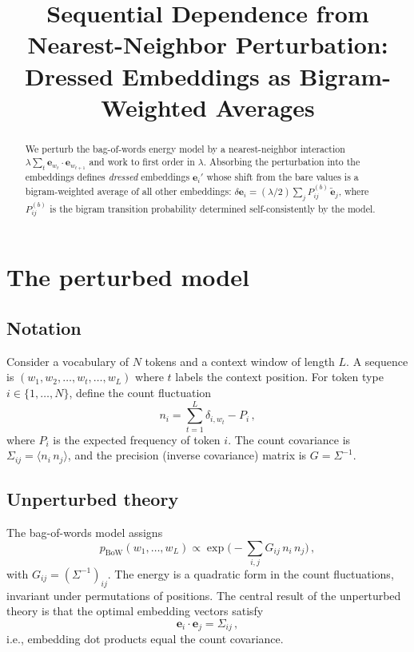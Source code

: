 \documentclass[11pt]{article}
\title{Sequential Dependence from Nearest-Neighbor Perturbation:\\Dressed Embeddings as Bigram-Weighted Averages}
\author{}
\date{}
\newcommand{\ee}{\bm{e}}
\newcommand{\BoW}{\mathrm{BoW}}
\begin{document}
\maketitle

\begin{abstract}
We perturb the bag-of-words energy model by a nearest-neighbor interaction $\lambda \sum_t \ee_{w_t} \cdot \ee_{w_{t+1}}$ and work to first order in $\lambda$. Absorbing the perturbation into the embeddings defines \emph{dressed} embeddings $\ee_i'$ whose shift from the bare values is a bigram-weighted average of all other embeddings: $\delta \ee_i = (\lambda/2)\sum_j P_{ij}^{(b)}\, \tilde{\ee}_j$, where $P_{ij}^{(b)}$ is the bigram transition probability determined self-consistently by the model.
\end{abstract}

\tableofcontents

\section{The perturbed model}\label{sec:setup}

\subsection{Notation}

Consider a vocabulary of $N$ tokens and a context window of length $L$. A sequence is $(w_1, w_2, \ldots, w_t, \ldots, w_L)$ where $t$ labels the context position. For token type $i \in \{1, \ldots, N\}$, define the count fluctuation
\begin{equation}\label{eq:count}
    n_i = \sum_{t=1}^{L} \delta_{i, w_t} - P_i\,,
\end{equation}
where $P_i$ is the expected frequency of token $i$. The count covariance is $\Sigma_{ij} = \langle n_i\, n_j \rangle$, and the precision (inverse covariance) matrix is $G = \Sigma^{-1}$.

\subsection{Unperturbed theory}

The bag-of-words model assigns
\begin{equation}\label{eq:bow}
    p_{\BoW}(w_1, \ldots, w_L) \propto \exp\!\Big(-\sum_{i,j} G_{ij}\, n_i\, n_j\Big)\,,
\end{equation}
with $G_{ij} = (\Sigma^{-1})_{ij}$. The energy is a quadratic form in the count fluctuations, invariant under permutations of positions. The central result of the unperturbed theory is that the optimal embedding vectors satisfy
\begin{equation}\label{eq:bow-result}
    \ee_i \cdot \ee_j = \Sigma_{ij}\,,
\end{equation}
i.e., embedding dot products equal the count covariance.
\end{document}
